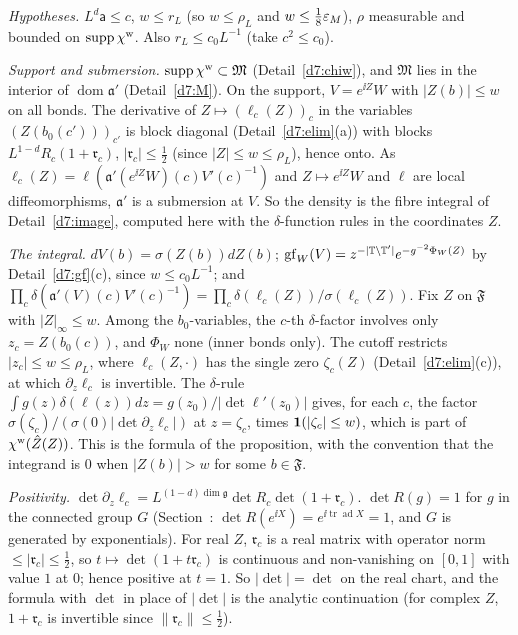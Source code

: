 \begin{detail}\label{d7:exact}
\emph{Hypotheses.} $L^d\mathsf a\le c$, $w\le r_L$ (so $w\le\rho_L$ and $w\le\frac18\varepsilon_M$), $\rho$ measurable and bounded on $\operatorname{supp}\chi^{\rm w}$. Also $r_L\le c_0L^{-1}$ (take $c^2\le c_0$).
\begin{step}
\emph{Support and submersion.} $\operatorname{supp}\chi^{\rm w}\subset\mathfrak M$ (Detail~\ref{d7:chiw}), and $\mathfrak M$ lies in the interior of $\operatorname{dom}\mathfrak a'$ (Detail~\ref{d7:M}). On the support, $V=e^{\ii Z}W$ with $|Z(b)|\le w$ on all bonds. The derivative of $Z\mapsto(\ell_c(Z))_c$ in the variables $(Z(b_0(c')))_{c'}$ is block diagonal (Detail~\ref{d7:elim}(a)) with blocks $L^{1-d}R_c(1+\mathfrak r_c)$, $|\mathfrak r_c|\le\frac12$ (since $|Z|\le w\le\rho_L$), hence onto. As $\ell_c(Z)=\ell(\mathfrak a'(e^{\ii Z}W)(c)V'(c)^{-1})$ and $Z\mapsto e^{\ii Z}W$ and $\ell$ are local diffeomorphisms, $\mathfrak a'$ is a submersion at $V$. So the density is the fibre integral of Detail~\ref{d7:image}, computed here with the $\delta$-function rules in the coordinates $Z$.
\end{step}
\begin{step}
\emph{The integral.} $dV(b)=\sigma(Z(b))dZ(b)$; $\mathrm{gf}_W(V)=z^{-|\mathbb T\setminus\mathbb T'|}e^{-g^{-2}\Phi_W(Z)}$ by Detail~\ref{d7:gf}(c), since $w\le c_0L^{-1}$; and $\prod_c\delta(\mathfrak a'(V)(c)V'(c)^{-1})=\prod_c\delta(\ell_c(Z))/\sigma(\ell_c(Z))$. Fix $Z$ on $\mathfrak F$ with $|Z|_\infty\le w$. Among the $b_0$-variables, the $c$-th $\delta$-factor involves only $z_c=Z(b_0(c))$, and $\Phi_W$ none (inner bonds only). The cutoff restricts $|z_c|\le w\le\rho_L$, where $\ell_c(Z,\cdot)$ has the single zero $\zeta_c(Z)$ (Detail~\ref{d7:elim}(c)), at which $\partial_z\ell_c$ is invertible. The $\delta$-rule $\int g(z)\delta(\ell(z))dz=g(z_0)/|\det\ell'(z_0)|$ gives, for each $c$, the factor $\sigma(\zeta_c)/(\sigma(0)|\det\partial_z\ell_c|)$ at $z=\zeta_c$, times $\mathbf 1(|\zeta_c|\le w)$, which is part of $\chi^{\rm w}(\hat Z(Z))$. This is the formula of the proposition, with the convention that the integrand is $0$ when $|Z(b)|>w$ for some $b\in\mathfrak F$.
\end{step}
\begin{step}
\emph{Positivity.} $\det\partial_z\ell_c=L^{(1-d)\dim\mathfrak g}\det R_c\det(1+\mathfrak r_c)$. $\det R(g)=1$ for $g$ in the connected group $G$ (Section~: $\det R(e^{\ii X})=e^{\ii\operatorname{tr}\operatorname{ad}X}=1$, and $G$ is generated by exponentials). For real $Z$, $\mathfrak r_c$ is a real matrix with operator norm $\le|\mathfrak r_c|\le\frac12$, so $t\mapsto\det(1+t\mathfrak r_c)$ is continuous and non-vanishing on $[0,1]$ with value $1$ at $0$; hence positive at $t=1$. So $|\det|=\det$ on the real chart, and the formula with $\det$ in place of $|\det|$ is the analytic continuation (for complex $Z$, $1+\mathfrak r_c$ is invertible since $\|\mathfrak r_c\|\le\frac12$).

\end{step}
\end{detail}
